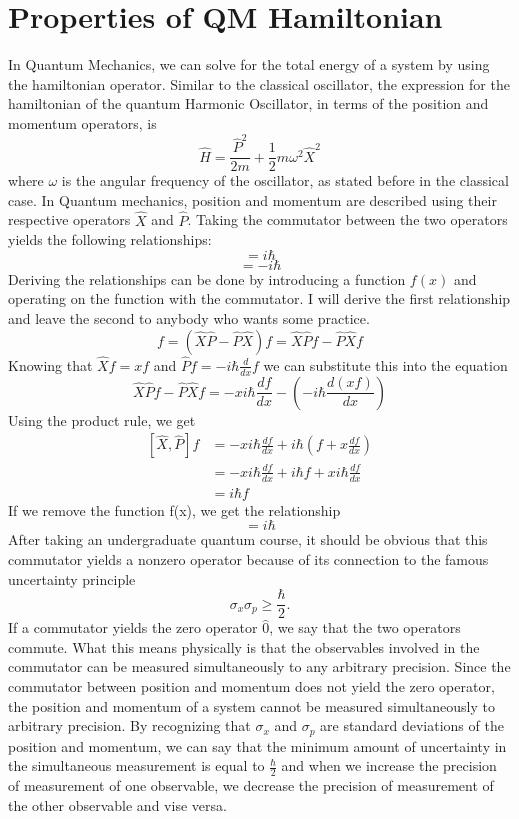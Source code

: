 \documentclass{article}
\newcommand{\be}{\begin{equation}}
\newcommand{\ee}{\end{equation}}
\begin{document}
\section{Properties of QM Hamiltonian}
In Quantum Mechanics, we can solve for the total energy of a system by using the hamiltonian operator. Similar to the classical oscillator, the expression for the hamiltonian of
the quantum Harmonic Oscillator, in terms of the position and momentum operators, is
\be
\hat{H}=\frac{\hat{P}^2}{2m} + \frac{1}{2}m\omega^2 \hat{X}^2
\ee
where $\omega$ is the angular frequency of the oscillator, as stated before in the classical case.
In Quantum mechanics, position and momentum are described using their respective operators $\hat{X}$ and $\hat{P}$.
Taking the commutator between the two operators yields the following relationships:
\be
[\hat{X},\hat{P}] = i \hbar
\ee
\be
[\hat{P},\hat{X}] = - i \hbar
\ee
Deriving the relationships can be done by introducing a function $f(x)$ and operating on the function with the commutator.
I will derive the first relationship and leave the second to anybody who wants some practice.
\be
[\hat{X},\hat{P}]f = (\hat{X} \hat{P} - \hat{P} \hat{X})f = \hat{X} \hat{P}f - \hat{P} \hat{X}f
\ee
Knowing that $\hat{X}f = x f$ and $\hat{P}f = - i \hbar \frac{d}{dx} f$ we can substitute this into the equation
\be
\hat{X} \hat{P}f - \hat{P} \hat{X}f = - x i \hbar \frac{df}{dx} - (- i \hbar \frac{d(xf)}{dx})
\ee
Using the product rule, we get
\be
\begin{split}
[\hat{X},\hat{P}]f &= - x i \hbar \frac{df}{dx} + i \hbar(f + x \frac{df}{dx}) \\
&= - x i \hbar \frac{df}{dx} + i \hbar f + x i \hbar \frac{df}{dx} \\
&= i \hbar f
\end{split}
\ee
If we remove the function f(x), we get the relationship
\be
[\hat{X},\hat{P}]= i \hbar
\ee
After taking an undergraduate quantum course, it should be obvious that this commutator yields a nonzero operator because of its connection to the famous uncertainty principle
\be
\sigma_x \sigma_p \geq \frac{\hbar}{2}.
\ee
If a commutator yields the zero operator $\hat{0}$, we say that the two operators commute. What this means physically is that the observables involved in the commutator
can be measured simultaneously to any arbitrary precision. Since the commutator between position and momentum does not yield the zero operator, the position and momentum of a
system cannot be measured simultaneously to arbitrary precision. By recognizing that $\sigma_x$ and $\sigma_p$ are standard deviations of the position and momentum, we can say that
the minimum amount of uncertainty in the simultaneous measurement is equal to $\frac{\hbar}{2}$ and when we increase the precision of measurement of one observable, we decrease the
precision of measurement of the other observable and vise versa.
\end{document}
